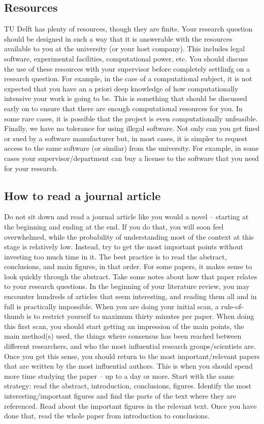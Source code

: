 \documentclass{article}
\begin{document}
\subsection{Resources}
TU Delft has plenty of resources, though they are finite. Your research question should be designed in such a way that it is answerable with the resources available to you at the university (or your host company). This includes legal software, experimental facilities, computational power, etc. You should discuss the use of these resources with your supervisor before completely settlinfg on a research question. For example, in the case of a computational subject, it is not expected that you have an a priori deep knowledge of how computationally intensive your work is going to be. This is something that should be discussed early on to ensure that there are enough computational resources for you. In some rare cases, it is possible that the project is even computationally unfeasible. Finally, we have no tolerance for using illegal software. Not only can you get fined or sued by a software manufacturer but, in most cases, it is simpler to request access to the same software (or similar) from the university. For example, in some cases your supervisor/department can buy a license to the software that you need for your research.

\subsection{How to read a journal article}
Do not sit down and read a journal article like you would a novel – starting at the beginning and ending at the end. If you do that, you will soon feel overwhelmed, while the probability of understanding most of the context at this stage is relatively low. Instead, try to get the most important points without investing too much time in it. The best practice is to read the abstract, conclusions, and main figures, in that order. For some papers, it makes sense to look quickly through the abstract. Take some notes about how that paper relates to your research questions. In the beginning of your literature review, you may encounter hundreds of articles that seem interesting, and reading them all and in full is practically impossible. When you are doing your initial scan, a rule-of-thumb is to restrict yourself to maximum thirty minutes per paper. When doing this first scan, you should start getting an impression of the main points, the main method(s) used, the things where consensus has been reached between different researchers, and who the most influential research groups/scientists are. Once you get this sense, you should return to the most important/relevant papers that are written by the most influential authors. This is when you should spend more time studying the paper – up to a day or more. Start with the same strategy: read the abstract, introduction, conclusions, figures. Identify the most interesting/important figures and find the parts of the text where they are referenced. Read about the important figures in the relevant text. Once you have done that, read the whole paper from introduction to conclusions.
\end{document}

